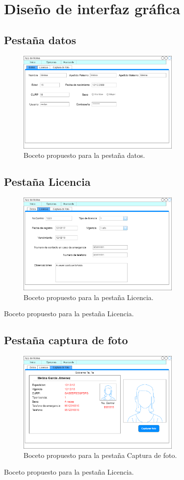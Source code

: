 \section{Diseño de interfaz gráfica}
		\subsection{Pestaña datos}
			\begin{figure}[H]
			\centering
				\includegraphics[height=5cm]{img/gui_datos}
				\caption{Boceto propuesto para la pestaña datos.}		
				\label{Pestaña datos}
			\end{figure}
			
		\subsection{Pestaña Licencia}
			\begin{figure}[H]
			\centering
				\includegraphics[height=5cm]{img/gui_licencia}
				\caption{Boceto propuesto para la pestaña Licencia.}		
				\label{Pestaña Licencia}
			\end{figure}
			Boceto propuesto para la pestaña Licencia.
			
		\subsection{Pestaña captura de foto}
			\begin{figure}[H]
			\centering
				\includegraphics[height=5cm]{img/gui_foto}
				\caption{Boceto propuesto para la pestaña Captura de foto.}		
				\label{Pestaña Licencia}
			\end{figure}
			Boceto propuesto para la pestaña Licencia.	